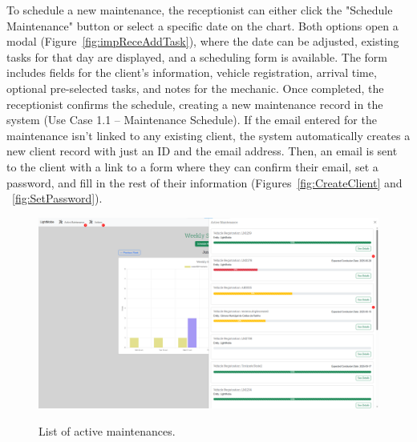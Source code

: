 To schedule a new maintenance, the receptionist can either click the "Schedule Maintenance" button or select a specific date on the chart. Both options open a modal (Figure~\ref{fig:impReceAddTask}), where the date can be adjusted, existing tasks for that day are displayed, and a scheduling form is available. The form includes fields for the client's information, vehicle registration, arrival time, optional pre-selected tasks, and notes for the mechanic. Once completed, the receptionist confirms the schedule, creating a new maintenance record in the system (Use Case 1.1 – Maintenance Schedule). If the email entered for the maintenance isn't linked to any existing client, the system automatically creates a new client record with just an ID and the email address. Then, an email is sent to the client with a link to a form where they can confirm their email, set a password, and fill in the rest of their information (Figures~\ref{fig:CreateClient} and ~\ref{fig:SetPassword}).

\begin{figure}[h]
  \caption{List of active maintenances.}
  \centering
  \includegraphics[width=\textwidth]{figs/Implementation/rececionist/activeMaintenances}
  \label{fig:impReceListMaint}
\end{figure}


